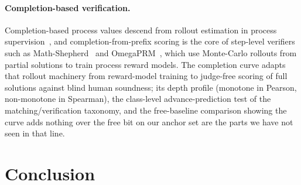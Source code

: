 \paragraph{Completion-based verification.}
Completion-based process values descend from rollout estimation in process supervision~\cite{lightman2023verify,wang2022selfconsistency}, and completion-from-prefix scoring is the core of step-level verifiers such as Math-Shepherd~\cite{wang2024mathshepherd} and OmegaPRM~\cite{luo2024omegaprm}, which use Monte-Carlo rollouts from partial solutions to train process reward models.
The completion curve adapts that rollout machinery from reward-model training to judge-free scoring of full solutions against blind human soundness; its depth profile (monotone in Pearson, non-monotone in Spearman), the class-level advance-prediction test of the matching/verification taxonomy, and the free-baseline comparison showing the curve adds nothing over the free bit on our anchor set are the parts we have not seen in that line.

\section{Conclusion}
\label{sec:conclusion}

